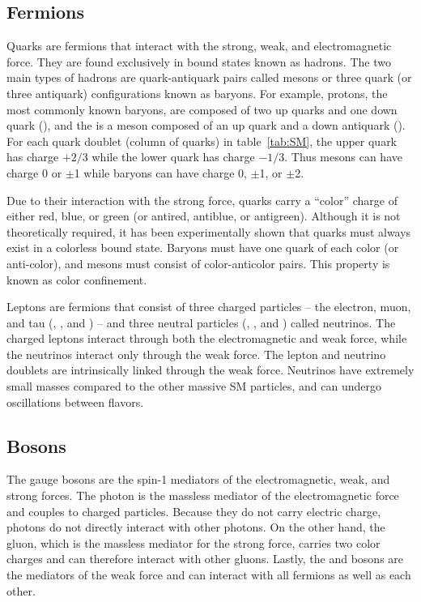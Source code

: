 \subsection{Fermions} \label{sec:sm_quarks}
Quarks are fermions that interact with the strong, weak, and electromagnetic force. They are found exclusively in bound states known as hadrons. The two main types of hadrons are quark-antiquark pairs called mesons or three quark (or three antiquark) configurations known as baryons. For example, protons, the most commonly known baryons, are composed of two up quarks and one down quark (\PQuns\PQuns\PQdns), and the \PGpp is a meson composed of an up quark and a down antiquark (\PQuns\PAQdns). For each quark doublet (column of quarks) in table~\ref{tab:SM}, the upper quark has charge $+2/3$ while the lower quark has charge $-1/3$. Thus mesons can have charge 0 or $\pm$1 while baryons can have charge 0, $\pm$1, or $\pm$2.

Due to their interaction with the strong force, quarks carry a ``color'' charge of either red, blue, or green (or antired, antiblue, or antigreen). Although it is not theoretically required, it has been experimentally shown that quarks must always exist in a colorless bound state. Baryons must have one quark of each color (or anti-color), and mesons must consist of color-anticolor pairs. This property is known as color confinement.

Leptons are fermions that consist of three charged particles -- the electron, muon, and tau (\Pe, \PGm, and \PGt) -- and three neutral particles (\PGne, \PGnGm, and \PGnGt) called neutrinos. The charged leptons interact through both the electromagnetic and weak force, while the neutrinos interact only through the weak force. The lepton and neutrino doublets are intrinsically linked through the weak force. Neutrinos have extremely small masses compared to the other massive SM particles, and can undergo oscillations between flavors.

\subsection{Bosons} \label{sec:sm_bosons}
The gauge bosons are the spin-1 mediators of the electromagnetic, weak, and strong forces. The photon is the massless mediator of the electromagnetic force and couples to charged particles. Because they do not carry electric charge, photons do not directly interact with other photons. On the other hand, the gluon, which is the massless mediator for the strong force, carries two color charges and can therefore interact with other gluons. Lastly, the \PZ and \PWpm bosons are the mediators of the weak force and can interact with all fermions as well as each other.

